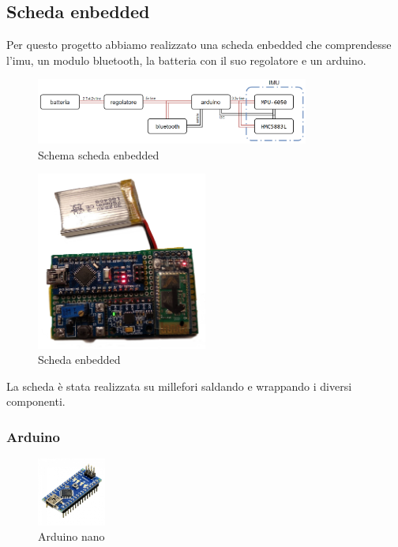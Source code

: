 \documentclass[10pt,a4paper]{article}
\begin{document}
\subsection{Scheda enbedded}
Per questo progetto abbiamo realizzato una scheda enbedded che comprendesse l'imu, un modulo bluetooth, la batteria con il suo regolatore e un arduino. 

\begin{figure}[h]
	\centering
	\includegraphics[width=0.80\textwidth]{scheda.png}
	\vspace{-10pt}
	\caption{Schema scheda enbedded}
	\label{fig:schema_scheda}
\end{figure}

\begin{figure}[h]
	\centering
	\vspace{-10pt}
	\includegraphics[width=0.50\textwidth]{scheda.jpg}
	\vspace{-10pt}
	\caption{Scheda enbedded}
	\label{fig:scheda}
\end{figure}
La scheda \`e stata realizzata su millefori saldando e wrappando i diversi componenti.
\subsubsection{Arduino}

\begin{figure}
	\centering
	\vspace{-30pt}
	\includegraphics[width=0.2\textwidth]{arduino.jpg}
	\vspace{-30pt}
	\caption{Arduino nano}
	\label{fig:arduino_nano}
	\vspace{0pt}
\end{figure}
\end{document}
